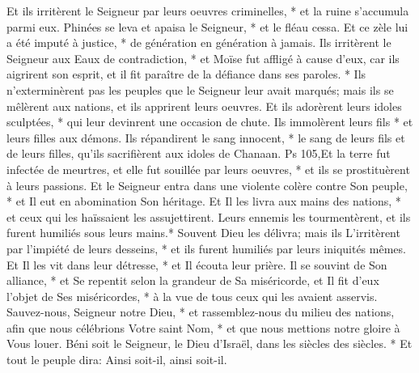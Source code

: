 Et ils irritèrent le Seigneur par leurs oeuvres criminelles, * et la ruine s'accumula parmi eux.
Phinées se leva et apaisa le Seigneur, * et le fléau cessa.
Et ce zèle lui a été imputé à justice, * de génération en génération à jamais.
Ils irritèrent le Seigneur aux Eaux de contradiction, * et Moïse fut affligé à cause d'eux,
car ils aigrirent son esprit, et il fit paraître de la défiance dans ses paroles. *
Ils n'exterminèrent pas les peuples que le Seigneur leur avait marqués;
mais ils se mêlèrent aux nations, et ils apprirent leurs oeuvres.
Et ils adorèrent leurs idoles sculptées, * qui leur devinrent une occasion de chute.
Ils immolèrent leurs fils * et leurs filles aux démons.
Ils répandirent le sang innocent, * le sang de leurs fils et de leurs filles, qu'ils sacrifièrent aux idoles de Chanaan.
Ps 105,Et la terre fut infectée de meurtres,
et elle fut souillée par leurs oeuvres, * et ils se prostituèrent à leurs passions.
Et le Seigneur entra dans une violente colère contre Son peuple, * et Il eut en abomination Son héritage.
Et Il les livra aux mains des nations, * et ceux qui les haïssaient les assujettirent.
Leurs ennemis les tourmentèrent, et ils furent humiliés sous leurs mains.*
Souvent Dieu les délivra; mais ils L'irritèrent par l'impiété de leurs desseins, * et ils furent humiliés par leurs iniquités mêmes.
Et Il les vit dans leur détresse, * et Il écouta leur prière.
Il se souvint de Son alliance, * et Se repentit selon la grandeur de Sa miséricorde,
et Il fit d'eux l'objet de Ses miséricordes, * à la vue de tous ceux qui les avaient asservis.
Sauvez-nous, Seigneur notre Dieu, * et rassemblez-nous du milieu des nations, afin que nous célébrions Votre saint Nom, * et que nous mettions notre gloire à Vous louer.
Béni soit le Seigneur, le Dieu d'Israël, dans les siècles des siècles. * Et tout le peuple dira: Ainsi soit-il, ainsi soit-il.

